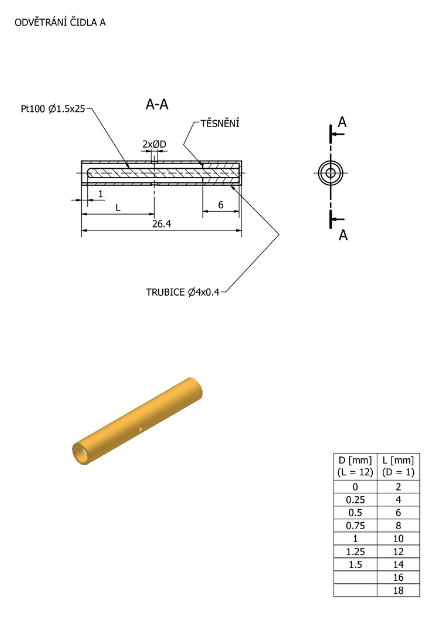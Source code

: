     \begin{figure}[ht!]
        \centering
        \includegraphics[width=\textwidth]{400_SIMULACE_KONSTRUKCNICH_UPRAV/Vykresy_rendery/Odvetrani_A_vykres.png}
        
    \end{figure}
    \newpage
{} \label{fig:difuzor-A-vykres}
